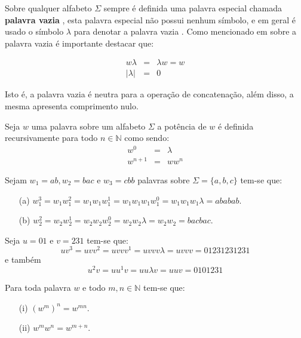 Sobre qualquer alfabeto $\Sigma$ sempre é definida uma palavra especial chamada \textbf{palavra vazia} \cite{hopcroft2008, linz2006}, esta palavra especial não possui nenhum símbolo, e em geral é usado o símbolo $\lambda$ para denotar a palavra vazia \cite{benjaLivro2010, valdi2016master}. Como mencionado em \cite{benjaLivro2010, valdi2020phd} sobre a palavra vazia é importante destacar que:

\begin{eqnarray}
	w\lambda & = & \lambda w = w\\
	|\lambda| & = &  0
\end{eqnarray}

Isto é, a palavra vazia é neutra para a operação de concatenação, além disso, a mesma apresenta comprimento nulo.

\begin{definition}\label{def:PotenciaPalavras}
	Seja $w$ uma palavra sobre um alfabeto $\Sigma$ a potência de $w$ é definida recursivamente para todo $n \in \mathbb{N}$ como sendo:
	\begin{eqnarray}
		w^0 & = & \lambda\\
		w^{n+1} & = & ww^{n}
	\end{eqnarray}
\end{definition}

\begin{example}
	Sejam $w_1 = ab, w_2 = bac$ e $w_3 = cbb$ palavras sobre $\Sigma = \{a, b, c\}$ tem-se que:
	\begin{itemize}
		\item[(a)] $w_1^3 = w_1w_1^2 = w_1w_1w_1^1 = w_1w_1w_1w_1^0 = w_1w_1w_1\lambda = ababab$.
		\item[(b)] $w_2^2 = w_2w_2^1 = w_2w_2w_2^0 = w_2w_2\lambda = w_2w_2 = bacbac$.
	\end{itemize} 
\end{example}

\begin{example}
	Seja $u = 01$ e $v = 231$ tem-se que: 
	$$uv^3 = uvv^2 = uvvv^1 = uvvv\lambda = uvvv = 01231231231$$
	e também 
	$$u^2v = uu^1v = uu\lambda v = uuv = 0101231$$
\end{example}

\begin{proposition}
	Para toda palavra $w$ e todo $m,n \in \mathbb{N}$ tem-se que:
	\begin{itemize}
		\item[(i)] $(w^m)^n = w^{mn}$.
		\item[(ii)] $w^mw^n = w^{m+n}$.
	\end{itemize}
\end{proposition}

